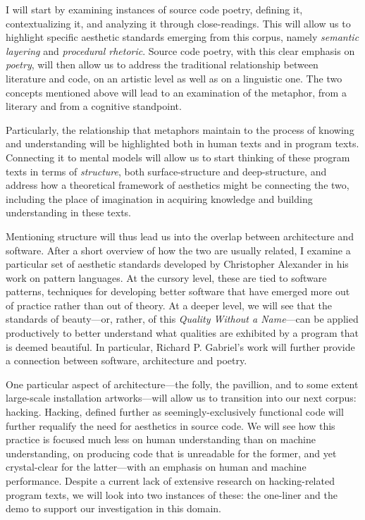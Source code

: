 \documentclass{article}
\begin{document}
I will start by examining instances of source code poetry, defining it, contextualizing it, and analyzing it through close-readings. This will allow us to highlight specific aesthetic standards emerging from this corpus, namely \emph{semantic layering} and \emph{procedural rhetoric}. Source code poetry, with this clear emphasis on \emph{poetry}, will then allow us to address the traditional relationship between literature and code, on an artistic level as well as on a linguistic one. The two concepts mentioned above will lead to an examination of the metaphor, from a literary and from a cognitive standpoint.

Particularly, the relationship that metaphors maintain to the process of knowing and understanding will be highlighted both in human texts and in program texts\cite{detienne_software_2012}. Connecting it to mental models will allow us to start thinking of these program texts in terms of \emph{structure}, both surface-structure and deep-structure, and address how a theoretical framework of aesthetics might be connecting the two, including the place of imagination in acquiring knowledge and building understanding in these texts.

Mentioning structure will thus lead us into the overlap between architecture and software. After a short overview of how the two are usually related, I examine a particular set of aesthetic standards developed by Christopher Alexander in his work on pattern languages. At the cursory level, these are tied to software patterns, techniques for developing better software that have emerged more out of practice rather than out of theory. At a deeper level, we will see that the standards of beauty—or, rather, of this \emph{Quality Without a Name}—can be applied productively to better understand what qualities are exhibited by a program that is deemed beautiful. In particular, Richard P. Gabriel's work will further provide a connection between software, architecture and poetry.

One particular aspect of architecture—the folly, the pavillion, and to some extent large-scale installation artworks—will allow us to transition into our next corpus: hacking. Hacking, defined further as seemingly-exclusively functional code will further requalify the need for aesthetics in source code. We will see how this practice is focused much less on human understanding than on machine understanding, on producing code that is unreadable for the former, and yet crystal-clear for the latter—with an emphasis on human and machine performance. Despite a current lack of extensive research on hacking-related program texts, we will look into two instances of these: the one-liner and the demo to support our investigation in this domain.
\end{document}

